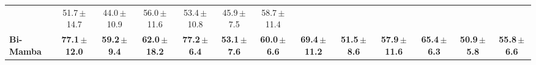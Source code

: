\documentclass[sigconf,nonacm]{acmart}
\begin{document}
\begin{table}[t]
{\begin{tabular}{lcccccccccccc}
      & 51.7{\scriptsize\,$\pm$14.7} & 44.0{\scriptsize\,$\pm$10.9} & 56.0{\scriptsize\,$\pm$11.6}
      & 53.4{\scriptsize\,$\pm$10.8} & 45.9{\scriptsize\,$\pm$7.5}  & 58.7{\scriptsize\,$\pm$11.4} \\
    \textbf{Bi-Mamba}
      & \textbf{77.1{\scriptsize\,$\pm$12.0}} & \textbf{59.2{\scriptsize\,$\pm$9.4}}  & \textbf{62.0{\scriptsize\,$\pm$18.2}}
      & \textbf{77.2{\scriptsize\,$\pm$6.4}}  & \textbf{53.1{\scriptsize\,$\pm$7.6}}  & \textbf{60.0{\scriptsize\,$\pm$6.6}}
      & \textbf{69.4{\scriptsize\,$\pm$11.2}} & \textbf{51.5{\scriptsize\,$\pm$8.6}}  & \textbf{57.9{\scriptsize\,$\pm$11.6}}
      & \textbf{65.4{\scriptsize\,$\pm$6.3}}  & \textbf{50.9{\scriptsize\,$\pm$5.8}}  & \textbf{55.8{\scriptsize\,$\pm$6.6}} \\
    \bottomrule
  \end{tabular}%
  }
\end{table}
\end{document}
